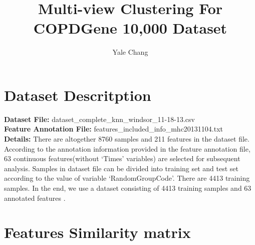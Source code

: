 \documentclass{article}
\title{Multi-view Clustering For COPDGene 10,000 Dataset}
\author{Yale Chang}
\date{}
\begin{document}
\maketitle

\section{Dataset Descritption}
\textbf{Dataset File:} dataset\_complete\_knn\_windsor\_11-18-13.csv\\
\textbf{Feature Annotation File:} features\_included\_info\_mhc20131104.txt\\
\textbf{Details:} There are altogether 8760 samples and 211 features in the dataset file. According to the annotation information provided in the feature annotation file, 63 continuous features(without `Times' variables) are selected for subsequent analysis. Samples in dataset file can be divided into training set and test set according to the value of variable `RandomGroupCode'. There are 4413 training samples. In the end, we use a dataset consisting of 4413 training samples and 63 annotated features .

\section{Features Similarity matrix}
\end{document}
